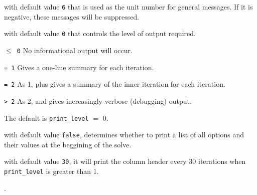 

\vspace{2mm}

\begin{description}

with default value {\tt 6} that is used as the unit number for general messages. If it is negative, these messages will be suppressed.

with default value {\tt 0} that controls the level of output required.
\begin{description}
\item{\tt $\leq$ 0} No informational output will occur.
\item{\tt = 1} Gives a one-line summary for each iteration.
\item{\tt = 2} As 1, plus gives a summary of the inner iteration for each iteration.
\item{\tt > 2} As 2, and gives increasingly verbose (debugging) output.
\end{description}
The default is {\tt print\_level} $=$ 0.
\end{description}

with default value {\tt false}, determines whether to print a list of all options and their values at the beggining of the solve.

with default value {\tt 30}, it will print the column header every 30 iterations when {\tt print\_level} is greater than 1.

.

